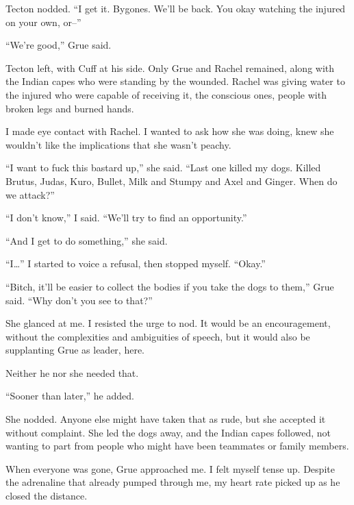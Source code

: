 Tecton nodded.  ``I get it.  Bygones.  We'll be back.  You okay watching the injured on your own, or--''



``We're good,'' Grue said.



Tecton left, with Cuff at his side.  Only Grue and Rachel remained, along with the Indian capes who were standing by the wounded.  Rachel was giving water to the injured who were capable of receiving it, the conscious ones, people with broken legs and burned hands.



I made eye contact with Rachel.  I wanted to ask how she was doing, knew she wouldn't like the implications that she wasn't peachy.



``I want to fuck this bastard up,'' she said.  ``Last one killed my dogs.  Killed Brutus, Judas, Kuro, Bullet, Milk and Stumpy and Axel and Ginger.  When do we attack?''



``I don't know,'' I said.  ``We'll try to find an opportunity.''



``And I get to do something,'' she said.



``I\ldots'' I started to voice a refusal, then stopped myself.  ``Okay.''



``Bitch, it'll be easier to collect the bodies if you take the dogs to them,'' Grue said.  ``Why don't you see to that?''



She glanced at me.  I resisted the urge to nod.  It would be an encouragement, without the complexities and ambiguities of speech, but it would also be supplanting Grue as leader, here.



Neither he nor she needed that.



``Sooner than later,'' he added.



She nodded.  Anyone else might have taken that as rude, but she accepted it without complaint.  She led the dogs away, and the Indian capes followed, not wanting to part from people who might have been teammates or family members.



When everyone was gone, Grue approached me.  I felt myself tense up.  Despite the adrenaline that already pumped through me, my heart rate picked up as he closed the distance.



